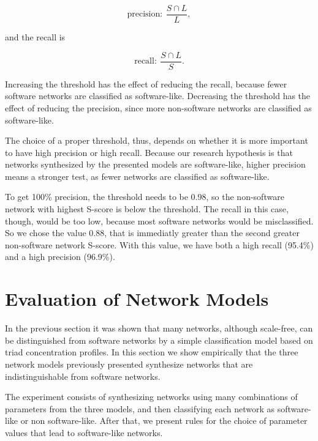 $$
\mathrm{precision}: ~\frac{S \cap L}{L},
$$

and the recall is

$$
\mathrm{recall}: ~\frac{S \cap L}{S}.
$$

Increasing the threshold has the effect of reducing the recall, because fewer
software networks are classified as software-like. Decreasing the threshold has
the effect of reducing the precision, since more non-software networks are
classified as software-like. 

The choice of a proper threshold, thus, depends on whether it is more important
to have high precision or high recall. Because our research hypothesis is that
networks synthesized by the presented models are software-like, higher precision
means a stronger test, as fewer networks are classified as software-like.

To get 100\% precision, the threshold needs to be 0.98, so the non-software
network with highest S-score is below the threshold. The recall in this case,
though, would be too low, because most software networks would be misclassified.
So we chose the value 0.88, that is immediatly greater than the second greater
non-software network S-score. With this value, we have both a high recall
(95.4\%) and a high precision (96.9\%).



\section{Evaluation of Network Models}

In the previous section it was shown that many networks, although scale-free,
can be distinguished from software networks by a simple classification model
based on triad concentration profiles. In this section we show empirically that
the three network models previously presented synthesize networks that are
indistinguishable from software networks.

The experiment consists of synthesizing networks using many combinations of
parameters from the three models, and then classifying each network as
software-like or non software-like. After that, we present rules for the choice
of parameter values that lead to software-like networks.

